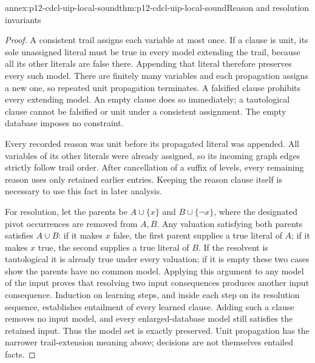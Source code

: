 \begin{annexitem}{annex:p12-cdcl-uip-local-sound}{thm:p12-cdcl-uip-local-sound}{Reason and resolution invariants}
\begin{proof}
A consistent trail assigns each variable at most once.  If a clause is unit,
its sole unassigned literal must be true in every model extending the trail,
because all its other literals are false there.  Appending that literal
therefore preserves every such model.  There are finitely many variables and
each propagation assigns a new one, so repeated unit propagation terminates.
A falsified clause prohibits every extending model.  An empty clause does
so immediately; a tautological clause cannot be falsified or unit under a
consistent assignment.  The empty database imposes no constraint.

Every recorded reason was unit before its propagated literal was appended.
All variables of its other literals were already assigned, so its incoming
graph edges strictly follow trail order.  After cancellation of a suffix of
levels, every remaining reason uses only retained earlier entries.  Keeping
the reason clause itself is necessary to use this fact in later analysis.

For resolution, let the parents be \(A\cup\{x\}\) and
\(B\cup\{\neg x\}\), where the designated pivot occurrences are removed
from \(A,B\).  Any valuation satisfying both parents satisfies \(A\cup B\):
if it makes \(x\) false, the first parent supplies a true literal of \(A\);
if it makes \(x\) true, the second supplies a true literal of \(B\).
If the resolvent is tautological it is already true under every valuation;
if it is empty these two cases show the parents have no common model.
Applying this argument to any model of the input proves that resolving two
input consequences produces another input consequence.  Induction on
learning steps, and inside each step on its resolution sequence, establishes
entailment of every learned clause.  Adding such a clause removes no input
model, and every enlarged-database model still satisfies the retained input.
Thus the model set is exactly preserved.  Unit propagation has the narrower
trail-extension meaning above; decisions are not themselves entailed facts.
\end{proof}
\end{annexitem}

